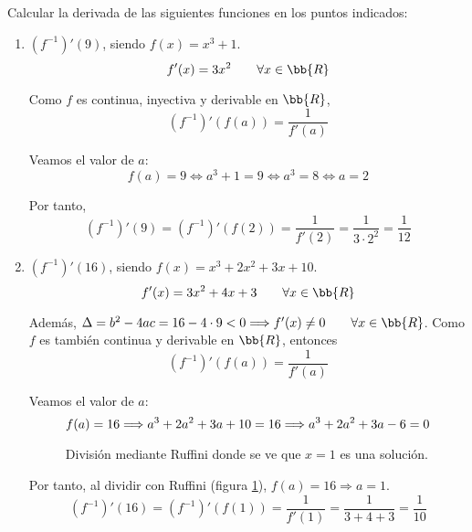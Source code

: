 \begin{ejercicio}
    Calcular la derivada de las siguientes funciones en los puntos indicados:
    \begin{enumerate}
        \item $(f^{-1})'(9)$, siendo $f(x)=x^3+1$.
        $$f'(x) = 3x^2 \qquad \forall x\in \bb{R}$$
        
        Como $f$ es continua, inyectiva y derivable en $\bb{R}$,
        \begin{equation*}
            (f^{-1})'(f(a)) = \frac{1}{f'(a)}
        \end{equation*}

        Veamos el valor de $a$:
        $$f(a)=9 \Longleftrightarrow a^3+1=9 \Longleftrightarrow a^3=8 \Longleftrightarrow a=2$$

        Por tanto,
        \begin{equation*}
            (f^{-1})'(9) = (f^{-1})'(f(2)) = \frac{1}{f'(2)} = \frac{1}{3\cdot 2^2} = \frac{1}{12}
        \end{equation*}
        

        \item $(f^{-1})'(16)$, siendo $f(x)=x^3+2x^2+3x+10$.
        $$f'(x) = 3x^2+4x+3 \qquad \forall x\in \bb{R}$$

        Además, $\Delta=b^2-4ac = 16-4\cdot 9 < 0 \Longrightarrow f'(x)\neq 0 \qquad \forall x \in \bb{R}$. Como $f$ es también continua y derivable en $\bb{R}$, entonces
        \begin{equation*}
            (f^{-1})'(f(a)) = \frac{1}{f'(a)}
        \end{equation*}

        Veamos el valor de $a$:
        \begin{equation*}
            f(a)=16 \Longrightarrow a^3+2a^2+3a+10 = 16 \Longrightarrow a^3+2a^2+3a-6 = 0 \\
        \end{equation*}

        \begin{figure}[H]
            \centering
            \caption{División mediante Ruffini donde se ve que $x=1$ es una solución.}
            \label{Fig:DivRuffini6.2}
        \end{figure}        

        Por tanto, al dividir con Ruffini (figura \ref{Fig:DivRuffini6.2}), $f(a)=16 \Longrightarrow a=1$.
        \begin{equation*}
            (f^{-1})'(16) = (f^{-1})'(f(1)) = \frac{1}{f'(1)} = \frac{1}{3+4+3} = \frac{1}{10}
        \end{equation*}


\end{enumerate}
\end{ejercicio}

